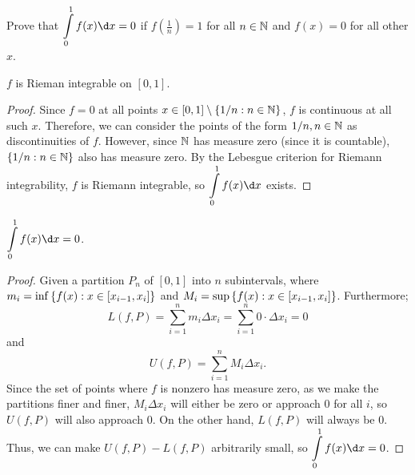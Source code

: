 \begin{problem}
  Prove that $\displaystyle \int\limits_0^1 f(x) \d x = 0$ if
  $f(\frac{1}{n})= 1$ for all $n \in \mathbb{N}$ and $f(x) = 0$ for all other $x$.
\end{problem}

\begin{answer}
  \begin{claim}
    $f$ is Rieman integrable on $[0, 1]$.

    \begin{proof}
      Since $f = 0$ at all points $x \in [0, 1] \setminus \{1/n : n \in \mathbb{N}\}$,
      $f$ is continuous at all such $x$. Therefore, we can consider
      the points of the form $1/n, n \in \mathbb{N}$ as discontinuities of $f$.
      However, since $\mathbb{N}$ has measure zero (since it is countable),
      $\left\{1/n : n \in \mathbb{N}\right\}$ also has measure zero.
      By the Lebesgue criterion for Riemann integrability, $f$ is Riemann integrable,
      so $\displaystyle \int\limits_0^1 f(x) \d x$ exists.
    \end{proof}
  \end{claim}

  \begin{claim}
    $\displaystyle \int\limits_0^1 f(x) \d x = 0$.

    \begin{proof}
      Given a partition $P_n$ of $[0, 1]$ into $n$ subintervals,
      \blue{\[
        L(f, P) = \sum_{i=1}^n m_i \Delta x_i
                \leq \int \limits_0^1 f(x) \d x
                \leq \sum_{i=1}^n M_i \Delta x_i
                = U(f, P),
      \]}
      where $m_i = \inf\left\{f(x) : x \in [x_{i-1}, x_i]\right\}$ and
      $M_i = \sup\left\{f(x) : x \in [x_{i-1}, x_i]\right\}$.
      Furthermore;
      \begin{equation}
        L(f, P) = \sum_{i=1}^n m_i \Delta x_i
                = \sum_{i=1}^n 0 \cdot \Delta x_i
                = 0
      \end{equation}
      and
      \begin{equation}
        U(f, P) = \sum_{i=1}^n M_i \Delta x_i.
      \end{equation}
      Since the set of points where $f$ is nonzero has measure zero,
      as we make the partitions finer and finer, $M_i \Delta x_i$ will
      either be zero or approach $0$ for all $i$, so $U(f, P)$ will also approach $0$.
      On the other hand, $L(f, P)$ will always be $0$.
      Thus, we can make $U(f, P) - L(f, P)$ arbitrarily small,
      so $\displaystyle \int\limits_0^1 f(x) \d x = 0$.
    \end{proof}
  \end{claim}
  \vspace{-1.5em}
\end{answer}
